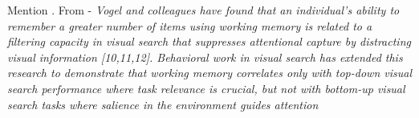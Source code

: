 \documentclass[]{rsos}%
\begin{document}
Mention \cite{vogel2008}.
From \cite{proulx2011} - \textit{Vogel and colleagues have found that an individual’s ability to remember a greater number of items using working memory is related to a filtering capacity in visual search that suppresses attentional capture by distracting visual information [10,11,12]. Behavioral work in visual search has extended this research to
demonstrate that working memory correlates only with top-down
visual search performance where task relevance is crucial, but not
with  bottom-up  visual  search  tasks  where  salience  in  the
environment guides attention \cite{sobel2007}}





\end{document}
